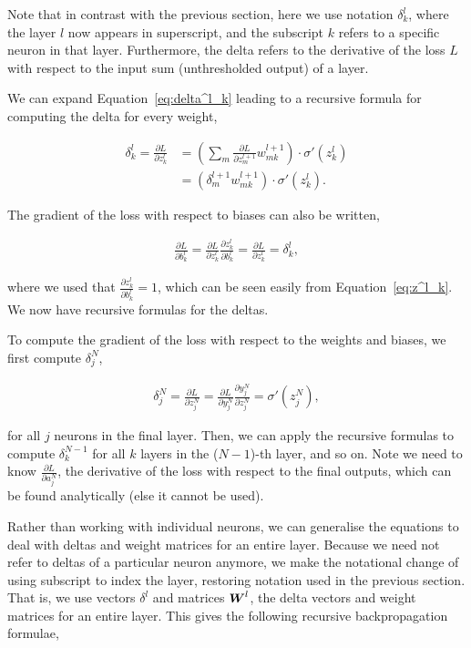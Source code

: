 Note that in contrast with the previous section, here we use notation \(\delta^l_k\), where the layer \(l\) now appears in superscript, and the subscript \(k\) refers to a specific neuron in that layer.
Furthermore, the delta refers to the derivative of the loss \(L\) with respect to the input sum (unthresholded output) of a layer.

We can expand Equation~\ref{eq:delta^l_k} leading to a recursive formula for computing the delta for every weight,

\begin{align}
    \delta^l_k = \frac{\partial L}{\partial z^l_k} &= \left(
        \sum_{m} \frac{\partial L}{\partial z^{l+1}_m} w^{l+1}_{mk}
    \right) \cdot
    \sigma'(z^l_k) \\
    &= \left(
        \delta^{l+1}_m w^{l+1}_{mk}
    \right) \cdot
    \sigma'(z^l_k).
\end{align}

The gradient of the loss with respect to biases can also be written,

\begin{align}
    \frac{\partial L}{\partial b^l_k} = \frac{\partial L}{\partial z^l_k} \frac{\partial z^l_k}{\partial b^l_k} = \frac{\partial L}{\partial z^l_k} = \delta^l_k,
\end{align}

where we used that \(\frac{\partial z^l_k}{\partial b^l_k} = 1\), which can be seen easily from Equation~\ref{eq:z^l_k}.
We now have recursive formulas for the deltas.

To compute the gradient of the loss with respect to the weights and biases, we first compute \(\delta^N_j\),

\begin{align}
    \delta^N_j = \frac{\partial L}{\partial z^N_j} = \frac{\partial L}{\partial y^N_j} \frac{\partial y^N_j}{\partial z^N_j} = \sigma'(z^N_j),
\end{align}

for all \(j\) neurons in the final layer. Then, we can apply the recursive formulas to compute \(\delta^{N-1}_k\) for all \(k\) layers in the (\(N-1\))-th layer, and so on.
Note we need to know \(\frac{\partial L}{\partial a^N_j}\), the derivative of the loss with respect to the final outputs, which can be found analytically (else it cannot be used).

Rather than working with individual neurons, we can generalise the equations to deal with deltas and weight matrices for an entire layer.
Because we need not refer to deltas of a particular neuron anymore, we make the notational change of using subscript to index the layer, restoring notation used in the previous section.
That is, we use vectors \(\delta^l\) and matrices \({\boldsymbol{{W}}}^l\), the delta vectors and weight matrices for an entire layer.
This gives the following recursive backpropagation formulae,

